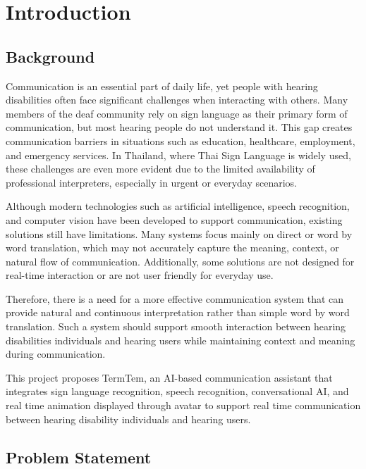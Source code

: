 \chapter{Introduction}
\label{chap:introduction}

\section{Background}
\label{section:background}

Communication is an essential part of daily life, yet people with hearing disabilities often face significant 
challenges when interacting with others. Many members of the deaf community rely on sign language as 
their primary form of communication, but most hearing people do not understand it.
This gap creates communication barriers in situations such as education, healthcare, employment, and emergency services.
In Thailand, where Thai Sign Language is widely used, these challenges are even more evident due to the limited availability of 
professional interpreters, especially in urgent or everyday scenarios.

Although modern technologies such as artificial intelligence, speech recognition, and computer vision have been developed to support communication, 
existing solutions still have limitations. Many systems focus mainly on direct or word by word translation, 
which may not accurately capture the meaning, context, or natural flow of communication. Additionally, some solutions are not designed for real-time interaction 
or are not user friendly for everyday use.

Therefore, there is a need for a more effective communication system that can provide natural and continuous interpretation rather than 
simple word by word translation. Such a system should support smooth interaction between hearing disabilities individuals and hearing users 
while maintaining context and meaning during communication.

This project proposes TermTem, an AI-based communication assistant that integrates sign language recognition, speech recognition, 
conversational AI, and real time animation displayed through avatar to support real time communication between hearing disability individuals and hearing users.

\section{Problem Statement}
\label{section:problem-statement}

